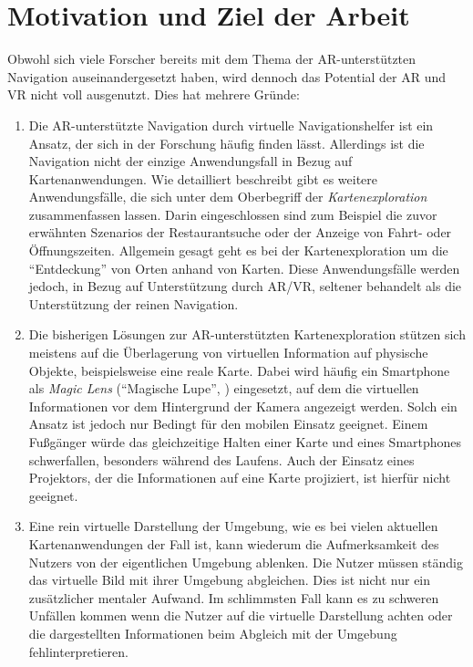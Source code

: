 \section{Motivation und Ziel der Arbeit}
\label{sec:motivation_ziel}
Obwohl sich viele Forscher bereits mit dem Thema der AR-unterstützten Navigation auseinandergesetzt haben, wird dennoch das Potential der AR und VR nicht voll ausgenutzt.
Dies hat mehrere Gründe:
\begin{enumerate}
\item Die AR-unterstützte Navigation durch virtuelle Navigationshelfer ist ein Ansatz, der sich in der Forschung häufig finden lässt.
Allerdings ist die Navigation nicht der einzige Anwendungsfall in Bezug auf Kartenanwendungen.
Wie \textcite{Reichenbacher2001} detailliert beschreibt gibt es weitere Anwendungsfälle, die sich unter dem Oberbegriff der \emph{Kartenexploration} zusammenfassen lassen.
Darin eingeschlossen sind zum Beispiel die zuvor erwähnten Szenarios der Restaurantsuche oder der Anzeige von Fahrt- oder Öffnungszeiten.
Allgemein gesagt geht es bei der Kartenexploration um die \enquote{Entdeckung} von Orten anhand von Karten.
Diese Anwendungsfälle werden jedoch, in Bezug auf Unterstützung durch AR/VR, seltener behandelt als die Unterstützung der reinen Navigation.

\item Die bisherigen Lösungen zur AR-unterstützten Kartenexploration stützen sich meistens auf die Überlagerung von virtuellen Information auf physische Objekte, beispielsweise eine reale Karte.
Dabei wird häufig ein Smartphone als \emph{Magic Lens} (\enquote{Magische Lupe}, \cite{Bier1994}) eingesetzt, auf dem die virtuellen Informationen vor dem Hintergrund der Kamera angezeigt werden.
Solch ein Ansatz ist jedoch nur Bedingt für den mobilen Einsatz geeignet.
Einem Fußgänger würde das gleichzeitige Halten einer Karte und eines Smartphones schwerfallen, besonders während des Laufens.
Auch der Einsatz eines Projektors, der die Informationen auf eine Karte projiziert, ist hierfür nicht geeignet.

\item Eine rein virtuelle Darstellung der Umgebung, wie es bei vielen aktuellen Kartenanwendungen der Fall ist, kann wiederum die Aufmerksamkeit des Nutzers von der eigentlichen Umgebung ablenken.
Die Nutzer müssen ständig das virtuelle Bild mit ihrer Umgebung abgleichen.
Dies ist nicht nur ein zusätzlicher mentaler Aufwand.
Im schlimmsten Fall kann es zu schweren Unfällen kommen wenn die Nutzer auf die virtuelle Darstellung achten oder die dargestellten Informationen beim Abgleich mit der Umgebung fehlinterpretieren.


\end{enumerate}
